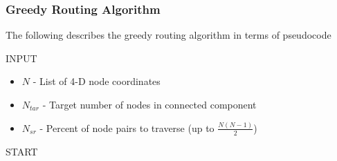 \documentclass[preprint,notitlepage,amsmath,amssymb,floatfix]{revtex4-1}
\begin{document}
\subsubsection{Greedy Routing Algorithm}
The following describes the greedy routing algorithm in terms of pseudocode
\begin{description}
  \item[INPUT]
\end{description}
\begin{itemize}[leftmargin=*]
  \item $N$ - List of 4-D node coordinates
  \item $N_{tar}$ - Target number of nodes in connected component
  \item $N_{sr}$ - Percent of node pairs to traverse (up to $\frac{N(N-1)}{2}$)
\end{itemize}
\begin{description}
  \item[START]
\end{description}
\end{document}
